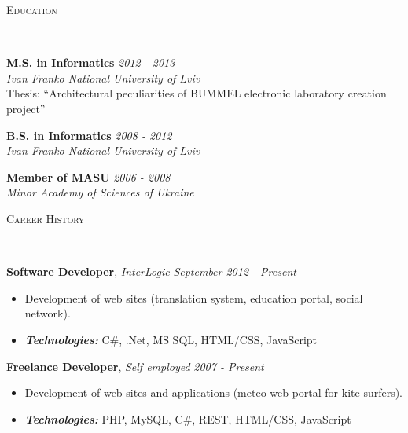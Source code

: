 \documentclass{article}
\newenvironment{changemargin}[2]{%
  \begin{list}{}{%
    \setlength{\topsep}{0pt}%
    \setlength{\leftmargin}{#1}%
    \setlength{\rightmargin}{#2}%
    \setlength{\listparindent}{\parindent}%
    \setlength{\itemindent}{\parindent}%
    \setlength{\parsep}{\parskip}%
  }%
  \item[]}{\end{list}
}
\newcommand{\lineover}{
  \begin{changemargin}{-1mm}{-1mm}
    \vspace*{-8pt}
    \hrulefill \\
    \vspace*{-2pt}
  \end{changemargin}
}
\newcommand{\header}[1]{
  \begin{changemargin}{-12mm}{-12mm}
    \scshape{#1}\\
    \lineover
  \end{changemargin}
}
\newenvironment{body}{
  \vspace*{-16pt}
  \begin{changemargin}{-6mm}{-12mm}
}{
  \end{changemargin}
}
\begin{document}



\header{Education}

\begin{body}
  \vspace{14pt}
  \textbf{M.S. in Informatics} \hfill \emph{2012 - 2013} \\
  \emph{Ivan Franko National University of Lviv} \\
  Thesis: ``Architectural peculiarities of BUMMEL electronic laboratory creation project''
  \medskip
  
  \textbf{B.S. in Informatics} \hfill \emph{2008 - 2012} \\
  \emph{Ivan Franko National University of Lviv}
  \medskip
  
  \textbf{Member of MASU} \hfill \emph{2006 - 2008} \\
  \emph{Minor Academy of Sciences of Ukraine}
  \medskip
\end{body}

\smallskip


\header{Career History}

\begin{body}
  \vspace{14pt}
  \textbf{Software Developer}, \emph{InterLogic} \hfill \emph{September 2012 - Present}\\
  \vspace*{-4pt}
  \begin{itemize} \itemsep -0pt
    \item Development of web sites (translation system, education portal, social network).
    \item \emph{\textbf{Technologies:}}{} C\#, .Net, MS SQL, HTML/CSS, JavaScript
  \end{itemize}
  \medskip

  \textbf {Freelance Developer}, \emph{Self employed} \hfill \emph{2007 - Present}\\
  \vspace*{-4pt}
  \begin{itemize} \itemsep -0pt
    \item Development of web sites and applications (meteo web-portal for kite surfers).
    \item \emph{\textbf{Technologies:}} PHP, MySQL, C\#, REST, HTML/CSS, JavaScript
  \end{itemize}

\end{body}
\end{document}
